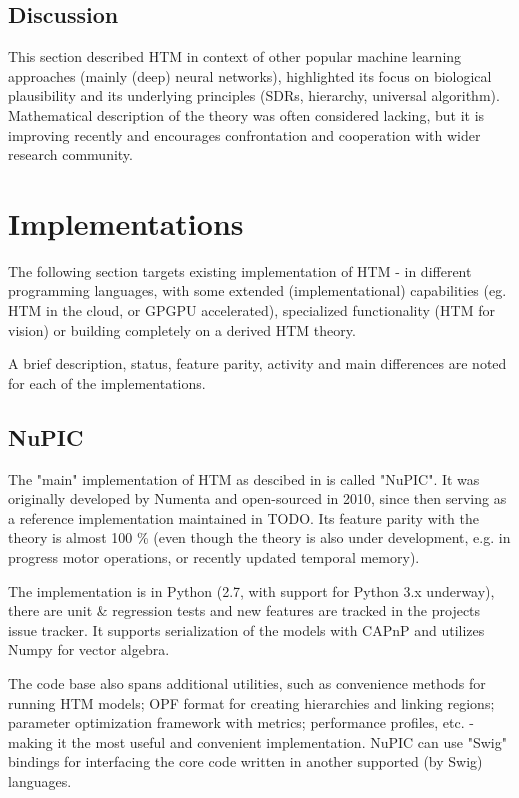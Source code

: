 \documentclass[a4,IEEEconf]{article}
\begin{document}
\subsection{Discussion}
This section described HTM in context of other popular machine learning approaches (mainly (deep) neural networks), highlighted its focus on biological plausibility and its underlying principles (SDRs, hierarchy, universal algorithm). Mathematical description of the theory was often considered lacking, but it is improving recently and encourages confrontation and cooperation with wider research community. 

\section{Implementations}
The following section targets existing implementation of HTM - in different programming languages, with some extended (implementational) capabilities (eg. HTM in the cloud, or GPGPU accelerated), specialized functionality (HTM for vision) or building completely on a derived HTM theory. 

A brief description, status, feature parity, activity and main differences are noted for each of the implementations. 
\subsection{NuPIC}
The "main" implementation of HTM as descibed in \cite{Hawkins:2010} is called "NuPIC". It was originally developed by Numenta and open-sourced in 2010, since then serving as a reference implementation maintained in TODO. Its feature parity with the theory is almost 100 \% (even though the theory is also under development, e.g. in progress motor operations, or recently updated temporal memory). 

The implementation is in Python (2.7, with support for Python 3.x underway), there are unit \& regression tests and new features are tracked in the projects issue tracker. It supports serialization of the models with CAPnP and utilizes Numpy for vector algebra. 

The code base also spans additional utilities, such as convenience methods for running HTM models; OPF format for creating hierarchies and linking regions; parameter optimization framework with metrics; performance profiles, etc. - making it the most useful and convenient implementation. NuPIC can use "Swig" bindings for interfacing the core code written in another supported (by Swig) languages. 
\end{document}
